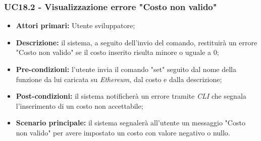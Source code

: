 \subsubsection{UC18.2 - Visualizzazione errore "Costo non valido"}
\begin{itemize}
	\item \textbf{Attori primari:} Utente sviluppatore;
	\item \textbf{Descrizione:} il sistema, a seguito dell'invio del comando, restituirà un errore "Costo non valido" se il costo inserito risulta minore o uguale a 0;
	\item \textbf{Pre-condizioni:}  l'utente invia il comando "set" seguito dal nome della funzione da lui caricata su \textit{Ethereum\glos}, dal costo e dalla descrizione;
	\item \textbf{Post-condizioni:} il sistema notificherà un errore tramite \textit{CLI\glo} che segnala l'inserimento di un costo non accettabile;
	\item \textbf{Scenario principale:} il sistema segnalerà all'utente un messaggio "Costo non valido" per avere impostato un costo con valore negativo o nullo.
\end{itemize}